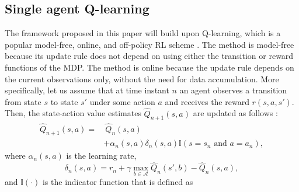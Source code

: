 \documentclass[lettersize,journal]{IEEEtran}
\begin{document}
\subsection{Single agent Q-learning}
The framework proposed in this paper will build upon Q-learning, which is  a popular model-free, online, and off-policy RL scheme \cite{Barto,sayed_2022}. The method is model-free because its update rule does not depend on using either the transition or reward functions of the MDP.  The method is online because the update rule depends on the current observations only, without the need for data accumulation. More specifically, let us assume that at time instant $n$ an agent observes a transition from state $s$ to state $s'$ under some action $a$ and receives the reward $r(s,a,s')$. Then, the state-action value estimates $\widehat{Q}_{n+1}(s,a)$ are updated as follows \cite{Barto,sayed_2022}:
\begin{align}
\label{eq:Q_update}
\widehat{Q}_{n+1}(s,a)=& \ \widehat{Q}_{n}(s,a) \nonumber
\\&+\alpha_n(s,a)\delta_n(s,a) \mathbb{I}(s=s_n \text{ and }a=a_n),
\end{align}
where $\alpha_n(s,a)$ is the learning rate, $$\delta_n(s,a)=r_n+\gamma \max \limits_{b \in \mathcal{A}}\widehat{Q}_n(s',b)-\widehat{Q}_n(s,a),$$ and $\mathbb{I}(\cdot)$ is the indicator function that is defined as 
\end{document}
